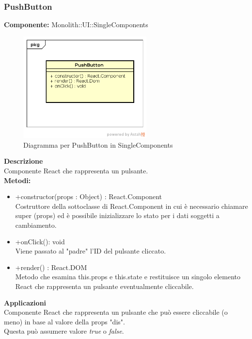 \subsubsection{PushButton}
\textbf{Componente:}  Monolith::UI::SingleComponents\\
   \FloatBarrier
   \begin{figure}[ht]
   \centering
   \includegraphics[width=0.6\textwidth]{img/single-PushButton}
   \caption{{Diagramma per PushButton in SingleComponents}}
\end{figure}
\FloatBarrier
\textbf{Descrizione}\\
Componente React che rappresenta un pulsante. \\
\textbf{Metodi:} 
\begin{itemize}
\item +constructor(props : Object) : React.Component 
\\
Costruttore della sottoclasse di React.Component in cui è necessario chiamare super (props) ed è possibile inizializzare lo stato per i dati soggetti a cambiamento.

\item +onClick(): void 
\\ 
Viene passato al "padre" l'ID del pulsante cliccato.

\item +render() : React.DOM 
\\
Metodo che esamina this.props e this.state e restituisce un singolo elemento React che rappresenta un pulsante eventualmente cliccabile.

\end{itemize} 


\textbf{Applicazioni}\\
Componente React che rappresenta un pulsante che può essere cliccabile (o meno) in base al valore della props "dis". \\ Questa può assumere valore \textit{true} o \textit{false}. 


